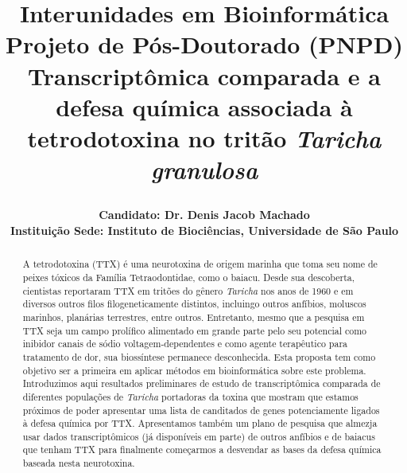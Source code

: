 \begin{titlepage}
    \author{
        \parbox{\linewidth}{\flushleft \fontsize{11}{14} \sffamily \bfseries 
            Candidato: Dr. Denis Jacob Machado\\
            Instituição Sede: Instituto de Biociências, Universidade de São Paulo%
        } %
    } %
    \title{
        {\fontsize{14}{17} \sc \sffamily
            Interunidades em Bioinformática %
        }\\[-2mm]
        {\fontsize{14}{17} \sffamily
            Projeto de Pós-Doutorado (PNPD) %
        }\\[10mm]
        {\color{RoyalBlue} \sffamily
            Transcriptômica comparada e a defesa química associada à tetrodotoxina no tritão \textit{Taricha granulosa} %
        }
        \date{} %
    } %
    \settitle \thispagestyle{empty}
    \renewcommand{\abstractname}{\color{RoyalBlue} \fontsize{12}{15} \bfseries \sffamily {Resumo}} %
    \begin{abstract}
    
A tetrodotoxina (TTX) é uma neurotoxina de origem marinha que toma seu nome de peixes tóxicos da Família Tetraodontidae, como o baiacu. Desde sua descoberta, cientistas reportaram TTX em tritões do gênero \textit{Taricha} nos anos de 1960 e em diversos outros filos filogeneticamente distintos, incluingo outros anfíbios,  moluscos marinhos, planárias terrestres, entre outros. Entretanto, mesmo que a pesquisa em TTX seja um campo prolífico alimentado em grande parte pelo seu potencial como inibidor canais de sódio voltagem-dependentes e como agente terapêutico para tratamento de dor, sua biossíntese permanece desconhecida. Esta proposta tem como objetivo ser a primeira em aplicar métodos em bioinformática sobre este problema. Introduzimos aqui resultados preliminares de estudo de transcriptômica comparada de diferentes populações de \textit{Taricha} portadoras da toxina que mostram que estamos próximos de poder apresentar uma lista de canditados de genes potenciamente ligados à defesa química por TTX. Apresentamos também um plano de pesquisa que almezja usar dados transcriptômicos (já disponíveis em parte) de outros anfíbios e de baiacus que tenham TTX para finalmente começarmos a desvendar as bases da defesa química baseada nesta neurotoxina.

    \end{abstract}
    \clearpage
\end{titlepage}
